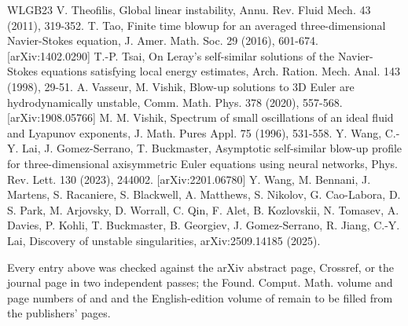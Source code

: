 \documentclass[11pt]{article}
\begin{document}
\begin{thebibliography}{WLGB23}
 V. Theofilis, Global linear instability, Annu. Rev. Fluid Mech. 43 (2011), 319-352.
 T. Tao, Finite time blowup for an averaged three-dimensional Navier-Stokes equation, J. Amer. Math. Soc. 29 (2016), 601-674. [arXiv:1402.0290]
 T.-P. Tsai, On Leray's self-similar solutions of the Navier-Stokes equations satisfying local energy estimates, Arch. Ration. Mech. Anal. 143 (1998), 29-51.
 A. Vasseur, M. Vishik, Blow-up solutions to 3D Euler are hydrodynamically unstable, Comm. Math. Phys. 378 (2020), 557-568. [arXiv:1908.05766]
 M. M. Vishik, Spectrum of small oscillations of an ideal fluid and Lyapunov exponents, J. Math. Pures Appl. 75 (1996), 531-558.
 Y. Wang, C.-Y. Lai, J. Gomez-Serrano, T. Buckmaster, Asymptotic self-similar blow-up profile for three-dimensional axisymmetric Euler equations using neural networks, Phys. Rev. Lett. 130 (2023), 244002. [arXiv:2201.06780]
 Y. Wang, M. Bennani, J. Martens, S. Racaniere, S. Blackwell, A. Matthews, S. Nikolov, G. Cao-Labora, D. S. Park, M. Arjovsky, D. Worrall, C. Qin, F. Alet, B. Kozlovskii, N. Tomasev, A. Davies, P. Kohli, T. Buckmaster, B. Georgiev, J. Gomez-Serrano, R. Jiang, C.-Y. Lai, Discovery of unstable singularities, arXiv:2509.14185 (2025).

\end{thebibliography}

\noindent Every entry above was checked against the arXiv abstract page, Crossref, or the journal page in two independent passes; the Found. Comput. Math. volume and page numbers of \cite{H23a} and \cite{H23b} and the English-edition volume of \cite{LZZ17} remain to be filled from the publishers' pages.
\end{document}
